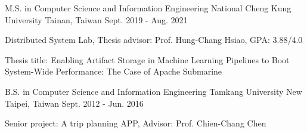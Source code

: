 

\begin{cventries}

  \cventry
    {M.S. in Computer Science and Information Engineering} %
    {National Cheng Kung University} %
    {Tainan, Taiwan} %
    {Sept. 2019 - Aug. 2021} %
    {
      \begin{cvitems} %
        \item {Distributed System Lab, Thesis advisor: Prof. Hung-Chang Hsiao, GPA: 3.88/4.0}
        \item {Thesis title: Enabling Artifact Storage in Machine Learning Pipelines to Boot System-Wide Performance: The Case of Apache Submarine}
      \end{cvitems}
    }

  \cventry
    {B.S. in Computer Science and Information Engineering} %
    {Tamkang University} %
    {New Taipei, Taiwan} %
    {Sept. 2012 - Jun. 2016} %
    {
      \begin{cvitems} %
        \item {Senior project: A trip planning APP, Advisor: Prof. Chien-Chang Chen}
      \end{cvitems}
    }

\end{cventries}
